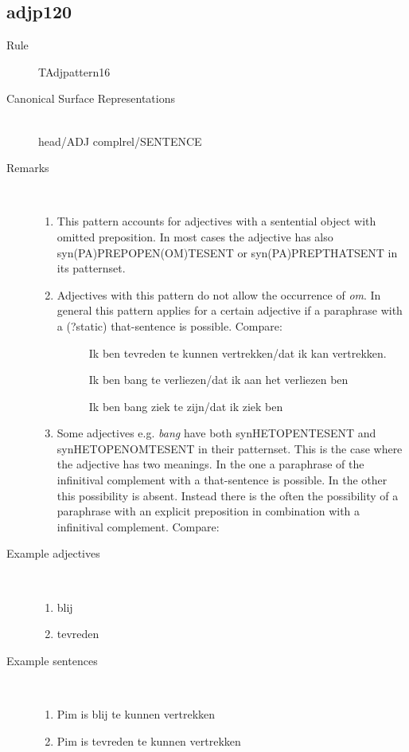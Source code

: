 \subsection{adjp120}
\begin{description}
  \item [Rule] TAdjpattern16
  \item [Canonical Surface Representations]  \mbox{}\\ head/ADJ complrel/SENTENCE
  \item [Remarks] \mbox{}\\
\begin{enumerate}
  \item 
This pattern accounts for adjectives with a sentential 
object with omitted preposition. In most cases the adjective has also
syn(PA)PREPOPEN(OM)TESENT or syn(PA)PREPTHATSENT in its patternset.  
  \item

Adjectives with this pattern do not allow the occurrence of {\em om}.
In general this pattern applies for a certain adjective if
a paraphrase with a (?static) that-sentence is possible. Compare:
\begin{description}
  \item []
Ik ben tevreden te kunnen vertrekken/dat ik kan vertrekken.
  \item []
Ik ben bang te verliezen/dat ik aan het verliezen ben
  \item []
Ik ben bang ziek te zijn/dat ik ziek ben
\end{description}
\item 
Some adjectives e.g. {\em bang} have both synHETOPENTESENT and 
synHETOPENOMTESENT in their patternset. This is the case where
the adjective has two meanings. In the one a paraphrase of the infinitival 
complement  with a that-sentence is possible. In the other
this possibility is absent. Instead there is the often the possibility of
a paraphrase with an explicit
preposition in combination with a infinitival complement.  Compare:

\end{enumerate}
  \item [Example adjectives] \mbox{}\\
\begin{enumerate}
  \item blij
  \item tevreden
\end{enumerate}
  \item [Example sentences] \mbox{}\\
\begin{enumerate}
  \item Pim is blij te kunnen vertrekken
  \item Pim is tevreden  te kunnen vertrekken
\end{enumerate}
\end{description}
\newpage
